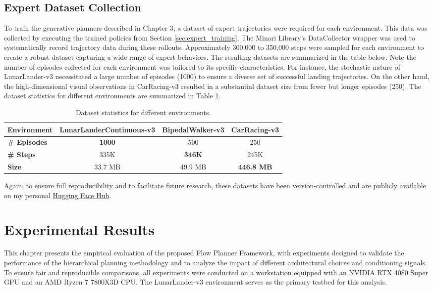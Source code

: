 \section{Expert Dataset Collection}
To train the generative planners described in Chapter 3, a dataset of expert trajectories were required for each environment. This data was collected by executing the trained policies from Section \ref{sec:expert_training}. The Minari \cite{minari} Library’s  DataCollector wrapper was used to systematically record trajectory data during these rollouts. Approximately 300,000 to 350,000 steps were sampled for each environment to create a robust dataset capturing a wide range of expert behaviors. The resulting datasets are summarized in the table below. Note the number of episodes collected for each environment was tailored to its specific characteristics. For instance, the stochastic nature of LunarLander-v3 necessitated a large number of episodes (1000) to ensure a diverse set of successful landing trajectories. On the other hand, the high-dimensional visual observations in CarRacing-v3 resulted in a substantial dataset size from fewer but longer episodes (250). The dataset statistics for different environments are summarized in Table \ref{tab:datasets}.
\begin{table}[H]
\centering
\caption{Dataset statistics for different environments.}
\label{tab:datasets}
\begin{tabular}{|l|c|c|c|}
\hline
\textbf{Environment} & \textbf{LunarLanderContinuous-v3} & \textbf{BipedalWalker-v3} & \textbf{CarRacing-v3} \\
\hline
\textbf{\# Episodes} & \textbf{1000} & 500 & 250 \\
\hline
\textbf{\# Steps}    & 335K & \textbf{346K} & 245K \\
\hline
\textbf{Size}        & 33.7 MB & 49.9 MB & \textbf{446.8 MB} \\
\hline
\end{tabular}
\end{table}

Again, to ensure full reproducibility and to facilitate future research, these datasets have been version-controlled and are publicly available on my personal \href {https://huggingface.co/frankcholula}{Hugging Face Hub}.

\chapter{Experimental Results}
\label{sec:exp_results}
This chapter presents the empirical evaluation of the proposed Flow Planner Framework, with experiments designed to validate the performance of the hierarchical planning methodology and to analyze the impact of different architectural choices and conditioning signals. To ensure fair and reproducible comparisons, all experiments were conducted on a workstation equipped with an NVIDIA RTX 4080 Super GPU and an AMD Ryzen 7 7800X3D CPU. The LunarLander-v3 environment serves as the primary testbed for this analysis.

